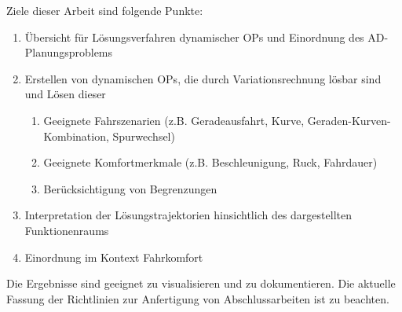 Ziele dieser Arbeit sind folgende Punkte:
\begin{enumerate}
	\item Übersicht für Lösungsverfahren dynamischer OPs und Einordnung des AD-Planungsproblems
	\item Erstellen von dynamischen OPs, die durch Variationsrechnung lösbar sind und Lösen dieser
	\begin{enumerate}
		\item Geeignete Fahrszenarien (z.B. Geradeausfahrt, Kurve, Geraden-Kurven-Kombination, Spurwechsel)
		\item Geeignete Komfortmerkmale (z.B. Beschleunigung, Ruck, Fahrdauer)
		\item Berücksichtigung von Begrenzungen
	\end{enumerate}
	\item Interpretation der Lösungstrajektorien hinsichtlich des dargestellten Funktionenraums 
	\item Einordnung im Kontext Fahrkomfort
\end{enumerate}

Die Ergebnisse sind geeignet zu visualisieren und zu dokumentieren. Die aktuelle Fassung der Richtlinien zur Anfertigung von Abschlussarbeiten ist zu beachten.


%
%
%

